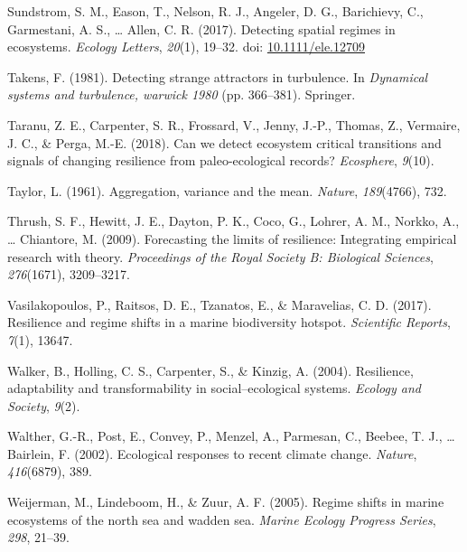 \documentclass[12pt,twoside,openany]{reedthesis}
\begin{document}
\leavevmode\hypertarget{ref-sundstrom2017detecting}{}%
Sundstrom, S. M., Eason, T., Nelson, R. J., Angeler, D. G., Barichievy, C., Garmestani, A. S., \ldots{} Allen, C. R. (2017). Detecting spatial regimes in ecosystems. \emph{Ecology Letters}, \emph{20}(1), 19--32. doi: \href{https://doi.org/10.1111/ele.12709}{10.1111/ele.12709}

\leavevmode\hypertarget{ref-takens1981detecting}{}%
Takens, F. (1981). Detecting strange attractors in turbulence. In \emph{Dynamical systems and turbulence, warwick 1980} (pp. 366--381). Springer.

\leavevmode\hypertarget{ref-taranu2018can}{}%
Taranu, Z. E., Carpenter, S. R., Frossard, V., Jenny, J.-P., Thomas, Z., Vermaire, J. C., \& Perga, M.-E. (2018). Can we detect ecosystem critical transitions and signals of changing resilience from paleo-ecological records? \emph{Ecosphere}, \emph{9}(10).

\leavevmode\hypertarget{ref-taylor1961aggregation}{}%
Taylor, L. (1961). Aggregation, variance and the mean. \emph{Nature}, \emph{189}(4766), 732.

\leavevmode\hypertarget{ref-thrush2009forecasting}{}%
Thrush, S. F., Hewitt, J. E., Dayton, P. K., Coco, G., Lohrer, A. M., Norkko, A., \ldots{} Chiantore, M. (2009). Forecasting the limits of resilience: Integrating empirical research with theory. \emph{Proceedings of the Royal Society B: Biological Sciences}, \emph{276}(1671), 3209--3217.

\leavevmode\hypertarget{ref-vasilakopoulos2017resilience}{}%
Vasilakopoulos, P., Raitsos, D. E., Tzanatos, E., \& Maravelias, C. D. (2017). Resilience and regime shifts in a marine biodiversity hotspot. \emph{Scientific Reports}, \emph{7}(1), 13647.

\leavevmode\hypertarget{ref-walker2004resilience}{}%
Walker, B., Holling, C. S., Carpenter, S., \& Kinzig, A. (2004). Resilience, adaptability and transformability in social--ecological systems. \emph{Ecology and Society}, \emph{9}(2).

\leavevmode\hypertarget{ref-walther_ecological_2002}{}%
Walther, G.-R., Post, E., Convey, P., Menzel, A., Parmesan, C., Beebee, T. J., \ldots{} Bairlein, F. (2002). Ecological responses to recent climate change. \emph{Nature}, \emph{416}(6879), 389.

\leavevmode\hypertarget{ref-weijerman2005regime}{}%
Weijerman, M., Lindeboom, H., \& Zuur, A. F. (2005). Regime shifts in marine ecosystems of the north sea and wadden sea. \emph{Marine Ecology Progress Series}, \emph{298}, 21--39.
\end{document}
